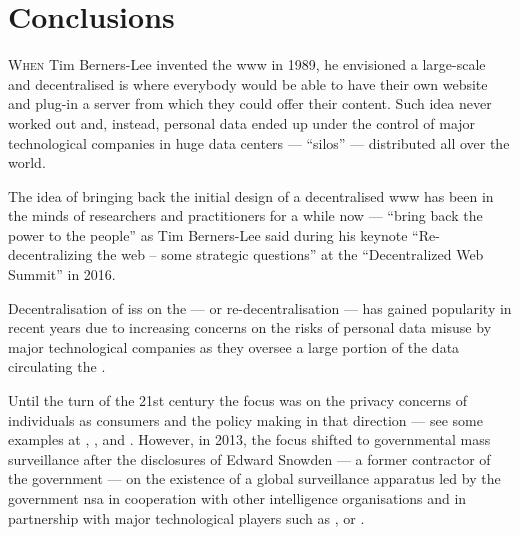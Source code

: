 
\chapter{Conclusions}
    \label{chapter:thesis:conclusions}

\lettrine{\textcolor[gray]{.25}{W}}{hen} Tim Berners-Lee invented the \Ac{www} in 
1989, he envisioned a large-scale and decentralised \ac{is} where everybody would 
be able to have their own website and plug-in a server from which they could offer 
their content. Such idea never worked out and, instead, personal data ended up under 
the control of major technological companies in huge data centers --- ``silos'' 
--- distributed all over the world.

The idea of bringing back the initial design of a decentralised \ac{www} has been 
in the minds of researchers and practitioners for a while now --- ``bring back the 
power to the people'' as Tim Berners-Lee said during his keynote ``Re-decentralizing 
the web -- some strategic questions'' at the ``Decentralized Web Summit'' in 2016. 

Decentralisation of \acp{is} on the \Internet --- or re-decentralisation --- has 
gained popularity in recent years due to increasing concerns on the risks of personal 
data misuse by major technological companies as they oversee a large portion of 
the data circulating the \Internet.

Until the turn of the 21st century the focus was on the privacy concerns of individuals 
as consumers and the policy making in that direction --- see some examples at \cite{MilbergBSK95}, 
\cite{Rindfleisch97}, \cite{Clarke99} and \cite{NamSPI06}. However, in 2013, the 
focus shifted to governmental mass surveillance after the disclosures of Edward 
Snowden --- a former contractor of the  government --- on the existence 
of a global surveillance apparatus led by the  government \Ac{nsa} in cooperation 
with other intelligence organisations and in partnership with major technological 
players such as \Google, \Facebook or \Apple. 

